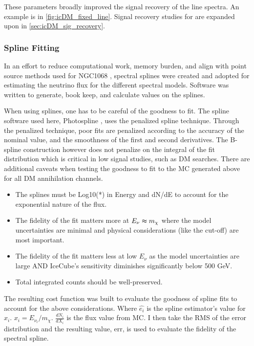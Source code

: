 These parameters broadly improved the signal recovery of the line spectra.
An example is in \cref{fig:icDM_fixed_line}.
Signal recovery studies for are expanded upon in \cref{sec:icDM_sig_recovery}.

\subsubsection{Spline Fitting}\label{sec:icDM_splines}

In an effort to reduce computational work, memory burden, and align with point source methods used for NGC1068 \cite{IC_NGC1068}, spectral splines were created and adopted for estimating the neutrino flux for the different spectral models.
Software was written to generate, book keep, and calculate values on the splines.

When using splines, one has to be careful of the goodness to fit.
The spline software used here, Photospline \cite{photospline}, uses the penalized spline technique.
Through the penalized technique, poor fits are penalized according to the accuracy of the nominal value, and the smoothness of the first and second derivatives.
The B-spline construction however does not penalize on the integral of the fit distribution which is critical in low signal studies, such as DM searches.
There are additional caveats when testing the goodness to fit to the MC generated above for all DM annihilation channels.
\begin{itemize}
    \item The splines must be Log10(*) in Energy and dN/dE to account for the exponential nature of the flux.
    \item The fidelity of the fit matters more at $ E_\nu \thickapprox m_\chi $ where the model uncertainties are minimal and physical considerations (like the cut-off) are most important.
    \item The fidelity of the fit matters less at low $ E_\nu $ as the model uncertainties are large AND IceCube's sensitivity diminishes significantly below 500 GeV.
    \item Total integrated counts should be well-preserved.
\end{itemize}
The resulting cost function was built to evaluate the goodness of spline fits to account for the above considerations.
\erriSpline
Where $ \hat{e_i} $ is the spline estimator's value for $x_i$. $ x_i = E_{\nu_i} / m_\chi $. $ \frac{dN_i}{dX_i} $ is the flux value from MC.
I then take the RMS of the error distribution and the resulting value, err, is used to evaluate the fidelity of the spectral spline.
\MSEspline

